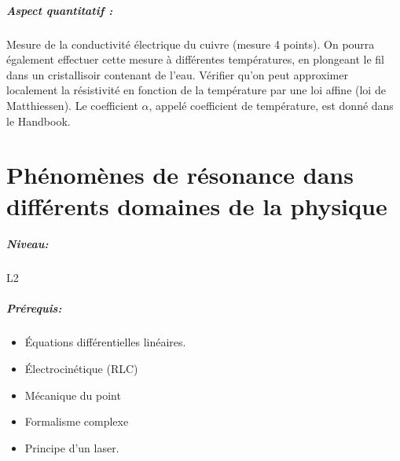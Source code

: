 \documentclass[11pt]{report}
\numberwithin{figure}{section}
\numberwithin{equation}{section}
\numberwithin{table}{section}
\newcommand{\1}{\boldsymbol{1}}
\begin{document}
\begin{tcolorbox}[breakable, enhanced, colback=red!2!white,colframe=mycolor!85!black,title=\textbf{\textbf{Expérience}}]
\paragraph*{Aspect quantitatif :} Mesure de la conductivité électrique du cuivre (mesure 4 points). On pourra également effectuer cette mesure à différentes températures, en plongeant le fil dans un cristallisoir contenant de l'eau. Vérifier qu'on peut approximer localement la résistivité en fonction de la température par une loi affine  (loi de Matthiessen). Le coefficient $\alpha$, appelé coefficient de température, est donné dans le Handbook.




\end{tcolorbox}



\newpage




\chapter{Phénomènes de résonance dans différents domaines de la physique}


\paragraph*{Niveau:} L2
\paragraph*{Prérequis:} 
\begin{itemize}
\item Équations différentielles linéaires.
\item Électrocinétique (RLC)
\item Mécanique du point
\item Formalisme complexe  
\item Principe d'un laser.
\end{itemize}
\end{document}
